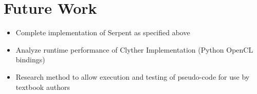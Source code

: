 \section{Future Work}
\begin{itemize}
\item Complete implementation of Serpent as specified above
\item Analyze runtime performance of Clyther Implementation (Python OpenCL bindings)
\item Research method to allow execution and testing of pseudo-code for use by textbook authors
\end{itemize}